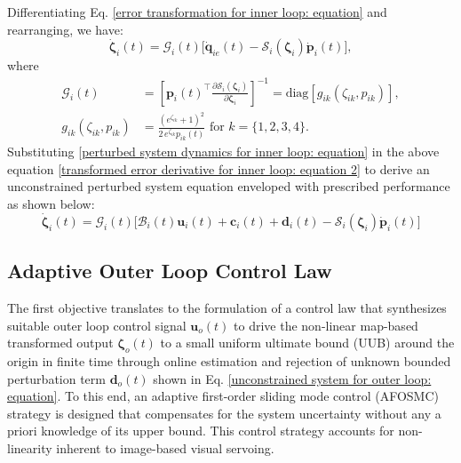 \documentclass[lettersize,journal]{IEEEtran}
\begin{document}
Differentiating Eq. \eqref{error transformation for inner loop: equation} and rearranging, we have:
\begin{equation} \label{transformed error derivative for inner loop: equation 2}
    \dot{\boldsymbol{\zeta}}_i(t) = \mathcal{G}_i(t) \big[\dot{\boldsymbol{q}}_{ie}(t) - \mathcal{S}_i(\boldsymbol{\zeta}_i) \dot{\boldsymbol{p}}_i(t)\big],    
\end{equation}
where
\begin{align*}
    \mathcal{G}_i(t) &= \left[\boldsymbol{p}_i(t)^{\top} \frac{\partial \mathcal{S}_i(\boldsymbol{\zeta}_i)}{\partial \boldsymbol{\zeta}_i}\right]^{-1} = \text{diag}[g_{ik}(\zeta_{ik}, p_{ik})], \nonumber \\
    g_{ik}(\zeta_{ik}, p_{ik}) &= \frac{(e^{\zeta_{ik}}+1)^2}{2\,e^{\zeta_{ik}} p_{ik}(t)} \text{ for } k = \{1, 2, 3, 4\}. \nonumber
\end{align*}
Substituting  \eqref{perturbed system dynamics for inner loop: equation} in the above equation \eqref{transformed error derivative for inner loop: equation 2} to derive an unconstrained perturbed system equation enveloped with prescribed performance as shown below:
\begin{equation} \label{unconstrained system for inner loop: equation}
    \dot{\boldsymbol{\zeta}}_i(t) = \mathcal{G}_i(t) \big[\mathcal{B}_i(t) \boldsymbol{u}_i(t) + \boldsymbol{c}_i(t) + \boldsymbol{d}_i(t) - \mathcal{S}_i(\boldsymbol{\zeta}_i) \dot{\boldsymbol{p}}_i(t) \big]
\end{equation}

\subsection{Adaptive Outer Loop Control Law} \label{adaptive controller for outer loop : section}
The first objective translates to the formulation of a control law that synthesizes suitable outer loop control signal $\boldsymbol{u}_o(t)$ to drive the non-linear map-based transformed output $\boldsymbol{\zeta}_o(t)$ to a small uniform ultimate bound (UUB) around the origin in finite time through online estimation and rejection of unknown bounded perturbation term $\boldsymbol{d}_o(t)$ shown in Eq. \eqref{unconstrained system for outer loop: equation}.
To this end, an adaptive first-order sliding mode control (AFOSMC) strategy is designed that compensates for the system uncertainty without any a priori knowledge of its upper bound.
This control strategy accounts for non-linearity inherent to image-based visual servoing.
\end{document}
